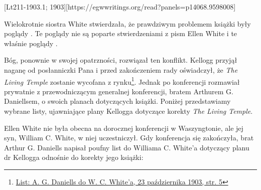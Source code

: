 [Lt211-1903.1; 1903][https://egwwritings.org/read?panels=p14068.9598008]

Wielokrotnie siostra White stwierdzała, że prawdziwym problemem książki były poglądy . Te poglądy nie są poparte stwierdzeniami z pism Ellen White i te właśnie poglądy .

Bóg, ponownie w swojej opatrzności, rozwiązał ten konflikt. Kellogg przyjął naganę od posłanniczki Pana i przed zakończeniem rady oświadczył, że \textit{The Living Temple} zostanie wycofana z rynku\footnote{\href{https://forgottenpillar.com/wp-content/uploads/2022/04/Letter-A-G-Daniells-to-W-C-White-October-29-1903.pdf}{List: A. G. Daniells do W. C. White'a, 23 października 1903, str. 5}}. Jednak po konferencji rozmawiał prywatnie z przewodniczącym generalnej konferencji, bratem Arthurem G. Daniellsem, o swoich planach dotyczących książki. Poniżej przedstawiamy wybrane listy, ujawniające plany Kellogga dotyczące korekty \textit{The Living Temple}.

Ellen White nie była obecna na dorocznej konferencji w Waszyngtonie, ale jej syn, William C. White, w niej uczestniczył. Gdy konferencja się zakończyła, brat Arthur G. Daniells napisał poufny list do Williama C. White'a dotyczący planu dr Kellogga odnośnie do korekty jego książki:


